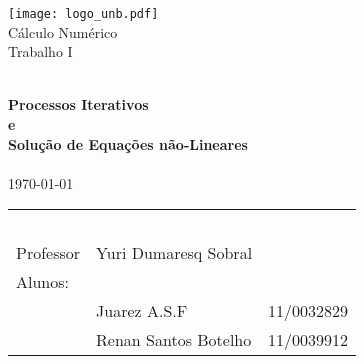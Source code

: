 \begin{titlepage}
\begin{center}

\texttt{[image: logo\_unb.pdf]}~\\[1cm]

\Huge Cálculo Numérico\\[0.5cm]

\huge Trabalho I

\HRule \\[0.4cm]
{ \huge \bfseries  Processos Iterativos \\e \\Solução de Equações não-Lineares}\\[0.4cm]

\HRule \\[0.5cm]

{\large \today}


\vfill %



	\begin{center} \large
		\begin{tabular}{llr} \
		& & \\[0.05cm]		
		Professor & Yuri Dumaresq Sobral & \\
		
		Alunos:& & \\
		& Juarez A.S.F 					& 11/0032829\\
		& Renan Santos Botelho 			& 11/0039912\\
			[0.05cm]	
		\end{tabular}

	
	\end{center}


\end{center}
\end{titlepage}